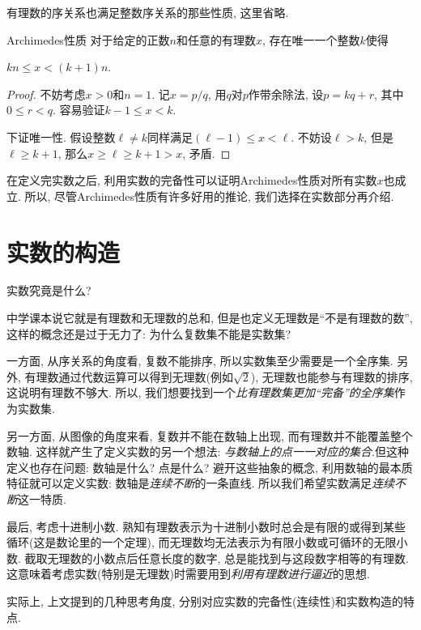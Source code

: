 有理数的序关系也满足整数序关系的那些性质, 这里省略.

\begin{theorem}{Archimedes性质}
	对于给定的正数$n$和任意的有理数$x$, 存在唯一一个整数$k$使得
	\begin{center}
		$kn \leq x < (k+1)n.$
	\end{center}
\end{theorem}
\begin{proof}
	不妨考虑$x>0$和$n=1$. 记$x=p/q$, 用$q$对$p$作带余除法, 设$p=kq+r$, 其中$0 \leq r <q$. 容易验证$k-1 \leq x < k$. 
	
	下证唯一性. 假设整数$\ell \neq k$同样满足$(\ell -1) \leq x < \ell$. 不妨设$\ell >k$, 但是$\ell \geq k+1$, 那么$x \geq \ell \geq k+1 >x$, 矛盾. 
\end{proof}

在定义完实数之后, 利用实数的完备性可以证明Archimedes性质对所有实数$x$也成立. 所以, 尽管Archimedes性质有许多好用的推论, 我们选择在实数部分再介绍. 

\newpage
\section{实数的构造}

实数究竟是什么? 

中学课本说它就是有理数和无理数的总和, 但是也定义无理数是“不是有理数的数”, 这样的概念还是过于无力了: 为什么复数集不能是实数集? 

一方面, 从序关系的角度看, 复数不能排序, 所以实数集至少需要是一个全序集. 另外, 有理数通过代数运算可以得到无理数(例如$\sqrt{2}$), 无理数也能参与有理数的排序, 这说明有理数不够大. 所以, 我们想要找到一个\textit{比有理数集更加“完备”的全序集}作为实数集. 

另一方面, 从图像的角度来看, 复数并不能在数轴上出现, 而有理数并不能覆盖整个数轴. 这样就产生了定义实数的另一个想法: \textit{与数轴上的点一一对应的集合}.但这种定义也存在问题: 数轴是什么? 点是什么? 避开这些抽象的概念, 利用数轴的最本质特征就可以定义实数: 数轴是\textit{连续不断}的一条直线. 所以我们希望实数满足\textit{连续不断}这一特质. 

最后, 考虑十进制小数. 熟知有理数表示为十进制小数时总会是有限的或得到某些循环(这是数论里的一个定理), 而无理数均无法表示为有限小数或可循环的无限小数. 截取无理数的小数点后任意长度的数字, 总是能找到与这段数字相等的有理数. 这意味着考虑实数(特别是无理数)时需要用到\textit{利用有理数进行逼近}的思想. 

实际上, 上文提到的几种思考角度, 分别对应实数的完备性(连续性)和实数构造的特点.

